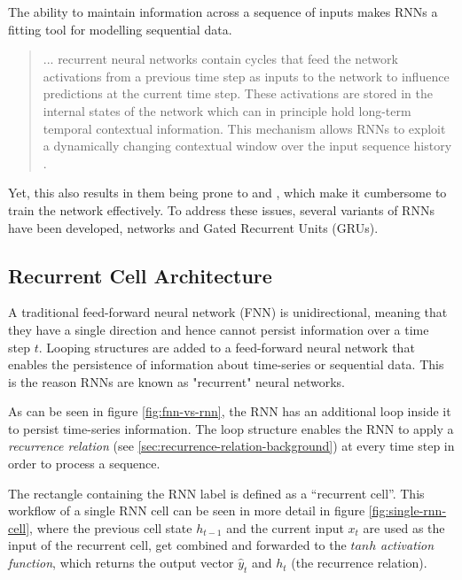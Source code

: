         The ability to maintain information across a sequence of inputs makes RNNs a fitting tool for modelling sequential data.
        \begin{quote}
            ... recurrent neural networks contain cycles that feed the network activations from a previous time step as inputs to the network to influence predictions at the current time step. These activations are stored in the internal states of the network which can in principle hold long-term temporal contextual information. This mechanism allows RNNs to exploit a dynamically changing contextual window over the input sequence history \cite{sakLongShortTermMemory2014}.
        \end{quote}
        Yet, this also results in them being prone to  and , which make it cumbersome to train the network effectively. 
        To address these issues, several variants of RNNs have been developed,  networks and Gated Recurrent Units (GRUs).
        
        
        \subsection{Recurrent Cell Architecture}
        \label{sec:recurrent-cell-architecture-background}

            A traditional feed-forward neural network (FNN) is unidirectional, meaning that they have a single direction and hence cannot persist information over a time step $t$.
            Looping structures are added to a feed-forward neural network that enables the persistence of information about time-series or sequential data. 
            This is the reason RNNs are known as "recurrent" neural networks.

            As can be seen in figure \ref{fig:fnn-vs-rnn}, the RNN has an additional loop inside it to persist time-series information. The loop structure enables the RNN to apply a \emph{recurrence relation} (see \ref{sec:recurrence-relation-background}) at every time step in order to process a sequence.

            The rectangle containing the RNN label is defined as a ``recurrent cell''.
            This workflow of a single RNN cell can be seen in more detail in figure \ref{fig:single-rnn-cell}, where the previous cell state $h_{t-1}$ and the current input $x_t$ are used as the input of the recurrent cell, get combined and forwarded to the $tanh$ \emph{activation function}, which returns the output vector $\hat{y}_t$ and $h_t$ (the recurrence relation).

